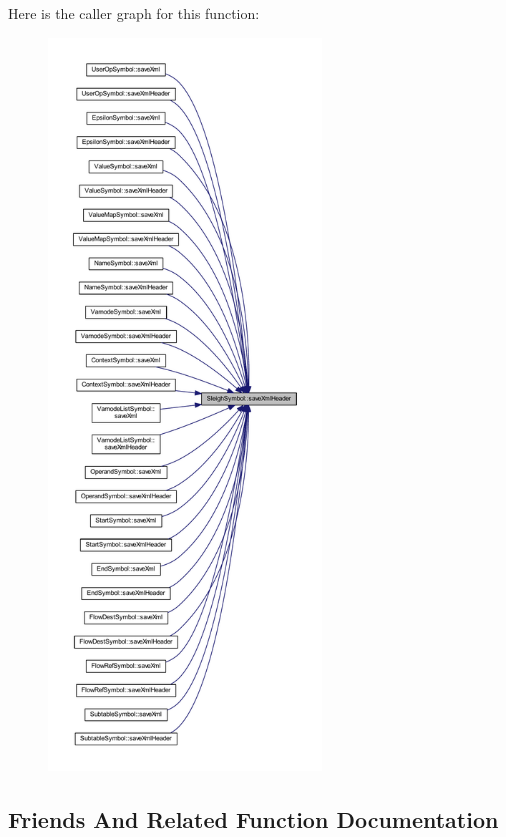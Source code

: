 Here is the caller graph for this function\+:
\nopagebreak
\begin{figure}[H]
\begin{center}
\leavevmode
\includegraphics[height=550pt]{class_sleigh_symbol_ac501be7c584bc0568c29fb95910962e9_icgraph}
\end{center}
\end{figure}


\subsection{Friends And Related Function Documentation}
\mbox{\label{class_sleigh_symbol_ac1b80bc52166901e909169b2657de45f}} 
